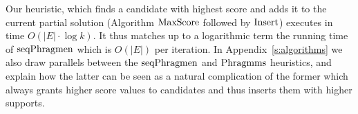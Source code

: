 Our heuristic, which finds a candidate with highest score and adds it to the current partial solution (Algorithm $\operatorname{MaxScore}$ followed by $\operatorname{Insert}$) executes in time $O(|E|\cdot \log k)$. 
It thus matches up to a logarithmic term the running time of $\operatorname{seqPhragmen}$ which is $O(|E|)$ per iteration. 
In Appendix~\ref{s:algorithms} we also draw parallels between the $\operatorname{seqPhragmen}$ and $\operatorname{Phragmms}$ heuristics, and explain how the latter can be seen as a natural complication of the former which always grants higher score values to candidates and thus inserts them with higher supports.

